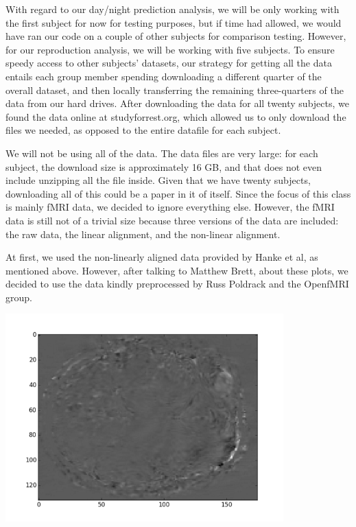 \documentclass[11pt]{article}
\begin{document}
With regard to our day/night prediction analysis, we will be only working with  
the first subject for now for testing purposes, but if time had allowed, we     
would have ran our code on a couple of other subjects for comparison testing.   
However, for our reproduction analysis, we will be working with five subjects.  
To ensure speedy access to other subjects' datasets, our strategy for getting all 
the data entails each group member spending downloading a different quarter of the 
overall dataset, and then locally transferring the remaining three-quarters of the 
data from our hard drives.  After downloading the data for all twenty subjects, we 
found the data online at studyforrest.org, which allowed us to only download the 
files we needed, as opposed to the entire datafile for each subject.  

We will not be using all of the data. The data files are very large: for each 
subject, the download size is approximately 16 GB, and that does not even 
include unzipping all the file inside. Given that we have twenty subjects, 
downloading all of this could be a paper in it of itself. Since the focus of 
this class is mainly fMRI data, we decided to ignore everything else. However, 
the fMRI data is still not of a trivial size because three versions of the data 
are included: the raw data, the linear alignment, and the non-linear alignment.   

At first, we used the non-linearly aligned data provided by Hanke et al, as
mentioned above.  However, after talking to Matthew Brett, about these plots, 
we decided to use the data kindly preprocessed by Russ Poldrack and the OpenfMRI 
group.  
\begin{center}                                                                  
\includegraphics[height=8cm]{1}                                                 
\end{center}    
\end{document}
